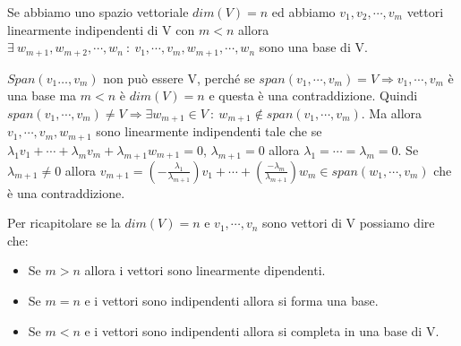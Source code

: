 \begin{proposition}
Se abbiamo uno spazio vettoriale $dim(V) = n$ ed abbiamo $v_1, v_2, \cdots, v_m$ vettori linearmente indipendenti di V con $m < n$ allora $\exists \: w_{m+1}, w_{m+2}, \cdots, w_n \::\: v_1, \cdots, v_m, w_{m+1}, \cdots, w_n$ sono una base di V.
\end{proposition}

\begin{demostration}
$Span(v_1 \ldots, v_m)$ non può essere V, perché se $span(v_1, \cdots, v_m) = V \Longrightarrow v_1, \cdots, v_m$ è una base ma $m<n$ è $dim(V) = n$ e questa è una contraddizione. Quindi $span(v_1,\cdots,v_m) \neq V \Longrightarrow \exists w_{m+1} \in V \::\: w_{m+1} \notin span(v_1, \cdots, v_m)$. Ma allora $v_1, \cdots, v_{m}, w_{m+1}$ sono linearmente indipendenti tale che se $\lambda_1v_1 + \cdots + \lambda_{m}v_m + \lambda_{m+1}w_{m+1} = 0$, $\lambda_{m+1} = 0 $ allora $\lambda_1 = \cdots = \lambda_m  = 0$. Se $\lambda_{m+1} \neq 0$ allora $v_{m+1} = (-\frac{\lambda_1}{\lambda_{m+1}})v_1 + \cdots + (\frac{-\lambda_m}{\lambda_{m+1}})w_m \in span(w_1, \cdots, v_m)$ che è una contraddizione.
\end{demostration}

\hspace{-15pt}Per ricapitolare se la $dim(V) = n$ e $v_1, \cdots, v_n$ sono vettori di V possiamo dire che:
\begin{itemize}
    \item Se $m > n$ allora i vettori sono linearmente dipendenti.
    \item Se $m = n$ e i vettori sono indipendenti allora si forma una base.
    \item Se $m < n$ e i vettori sono indipendenti allora si completa in una base di V.
\end{itemize} 

